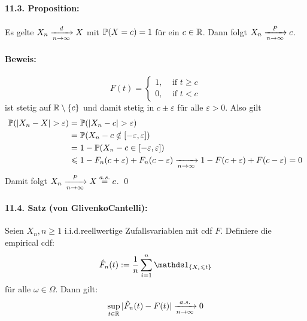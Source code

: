 \paragraph{11.3. Proposition:} Es gelte $X_n\nto{d}{n\to\infty}X$ mit $\mathbb{P}(X=c)=1$ f\"ur ein $c\in\mathbb{R}$. Dann folgt $X_n\nto{P}{n\to\infty}c$.

\paragraph{Beweis:} 
\begin{equation*}F(t)=
	\begin{cases}
	   1, \ \ \ \ \ \text{if }t\geq  c\\
	   0, \ \ \ \ \ \text{if }t<  c
	\end{cases}
\end{equation*}
ist stetig auf $\mathbb{R} \setminus\{c\}$ und damit stetig in $c\pm\varepsilon$ f\"ur alle $\varepsilon>0$. Also gilt
\begin{align*}
    \Pp(|X_n-X|>\varepsilon)&=\Pp(|X_n-c|>\varepsilon)\\
    &=\Pp(X_n-c\notin[-\varepsilon,\varepsilon]) \\
	&=1-\Pp(X_n-c\in[-\varepsilon,\varepsilon]) \\
	&\leq1-F_n(c+\varepsilon)+F_n(c-\varepsilon) \nto{}{n\to\infty}1-F(c+\varepsilon)+F(c-\varepsilon)=0
\end{align*}
Damit folgt $X_n\nto{P}{n\to\infty}X\overset{a.s.}{=}c$. \qed


\paragraph{11.4. Satz (von Glivenko\textendash Cantelli):} Seien $X_n, n\geq 1$ i.i.d.reellwertige Zufallsvariablen mit cdf $F$. Definiere die empirical cdf:
    $$\hat{F}_n(t):=\dfrac{1}{n}\sum_{i=1}^n\ind{\{X_i\leq t\}}$$
f\"ur alle $\omega\in\Omega$. Dann gilt:
	$$\sup_{t\in\R}|\hat{F}_n(t)-F(t)|\nto{a.s.}{n\to\infty}0$$

